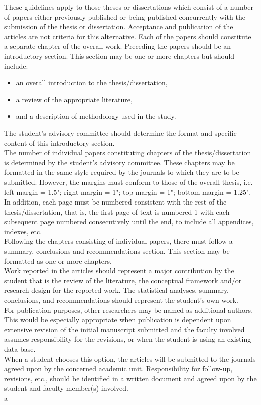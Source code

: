These guidelines apply to those theses or dissertations which consist of a number of papers either previously published or being published concurrently with the submission of the thesis or dissertation. Acceptance and publication of the articles are not criteria for this alternative. Each of the papers should constitute a separate chapter of the overall work. Preceding the papers should be an introductory section. This section may be one or more chapters but should include:
\begin{itemize}
    \item an overall introduction to the thesis/dissertation,
    \item a review of the appropriate literature,
    \item and a description of methodology used in the study.
\end{itemize}

The student’s advisory committee should determine the format and specific content of this introductory section. \\

The number of individual papers constituting chapters of the thesis/dissertation is determined by the student’s advisory committee. These chapters may be formatted in the same style required by the journals to which they are to be submitted. However, the margins must conform to those of the overall thesis, i.e. left margin = 1.5"; right margin = 1"; top margin = 1"; bottom margin = 1.25". In addition, each page must be numbered consistent with the rest of the thesis/dissertation, that is, the first page of text is numbered 1 with each subsequent page numbered consecutively until the end, to include all appendices, indexes, etc. \\

Following the chapters consisting of individual papers, there must follow a summary, conclusions and recommendations section. This section may be formatted as one or more chapters. \\

Work reported in the articles should represent a major contribution by the student that is the review of the literature, the conceptual framework and/or research design for the reported work. The statistical analyses, summary, conclusions, and recommendations should represent the student’s own work. \\

For publication purposes, other researchers may be named as additional authors. This would be especially appropriate when publication is dependent upon extensive revision of the initial manuscript submitted and the faculty involved assumes responsibility for the revisions, or when the student is using an existing data base. \\


When a student chooses this option, the articles will be submitted to the journals agreed upon by the concerned academic unit. Responsibility for follow-up, revisions, etc., should be identified in a written document and agreed upon by the student and faculty member(s) involved. \\
a
